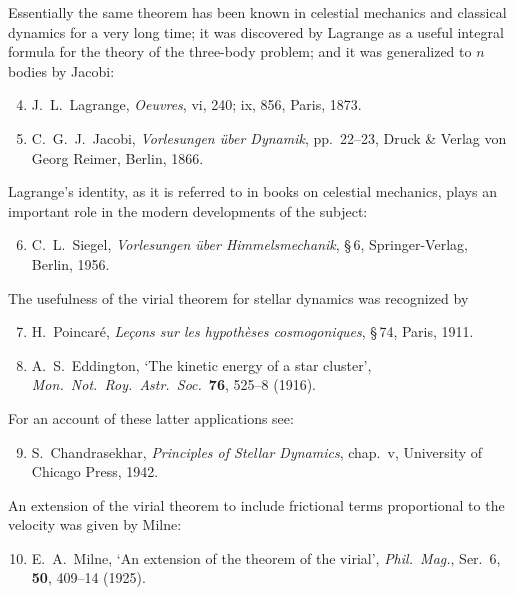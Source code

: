 Essentially the same theorem has been known in celestial mechanics and classical dynamics for a very long time; it was discovered by Lagrange as a useful integral formula for the theory of the three-body problem; and it was generalized to $n$ bodies by Jacobi:

\begin{enumerate}
\setcounter{enumi}{3}
\item J.\ L.\ Lagrange, \textit{Oeuvres}, vi, 240; ix, 856, Paris, 1873.
\item C.\ G.\ J.\ Jacobi, \textit{Vorlesungen \"uber Dynamik}, pp.\ 22--23, Druck \& Verlag von Georg Reimer, Berlin, 1866.
\end{enumerate}

Lagrange's identity, as it is referred to in books on celestial mechanics, plays an important role in the modern developments of the subject:

\begin{enumerate}
\setcounter{enumi}{5}
\item C.\ L.\ Siegel, \textit{Vorlesungen \"uber Himmelsmechanik}, \S\,6, Springer-Verlag, Berlin, 1956.
\end{enumerate}

The usefulness of the virial theorem for stellar dynamics was recognized by

\begin{enumerate}
\setcounter{enumi}{6}
\item H.\ Poincar\'e, \textit{Le\c{c}ons sur les hypoth\`eses cosmogoniques}, \S\,74, Paris, 1911.
\item A.\ S.\ Eddington, `The kinetic energy of a star cluster', \textit{Mon.\ Not.\ Roy.\ Astr.\ Soc.}\ \textbf{76}, 525--8 (1916).
\end{enumerate}

For an account of these latter applications see:

\begin{enumerate}
\setcounter{enumi}{8}
\item S.\ Chandrasekhar, \textit{Principles of Stellar Dynamics}, chap.\ v, University of Chicago Press, 1942.
\end{enumerate}

An extension of the virial theorem to include frictional terms proportional to the velocity was given by Milne:

\begin{enumerate}
\setcounter{enumi}{9}
\item E.\ A.\ Milne, `An extension of the theorem of the virial', \textit{Phil.\ Mag.}, Ser.\ 6, \textbf{50}, 409--14 (1925).
\end{enumerate}

